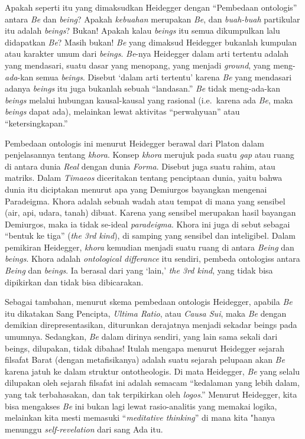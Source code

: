 \documentclass[11pt,twoside,a5paper,openany]{memoir}
\begin{document}
Apakah seperti itu yang dimaksudkan Heidegger dengan ``Pembedaan
ontologis'' antara \emph{Be} dan \emph{being}? Apakah \emph{kebuahan}
merupakan \emph{Be}, dan \emph{buah-buah} partikular itu adalah
\emph{beings}? Bukan! Apakah kalau \emph{beings} itu semua dikumpulkan
lalu didapatkan \emph{Be}? Masih bukan! \emph{Be} yang dimaksud
Heidegger bukanlah kumpulan atau karakter umum dari \emph{beings}.
\emph{Be}-nya Heidegger dalam arti tertentu adalah yang mendasari, suatu
dasar yang menopang, yang menjadi \emph{ground}, yang
meng-\emph{ada}-kan semua \emph{beings}. Disebut `dalam arti tertentu'
karena \emph{Be} yang mendasari adanya \emph{beings} itu juga bukanlah
sebuah ``landasan.'' \emph{Be} tidak meng-ada-kan \emph{beings} melalui
hubungan kausal-kausal yang rasional (i.e.~karena ada \emph{Be}, maka
\emph{beings} dapat ada), melainkan lewat aktivitas ``perwahyuan'' atau
``ketersingkapan.''

Pembedaan ontologis ini menurut Heidegger berawal dari Platon dalam
penjelasannya tentang \emph{khora}. Konsep \emph{khora} merujuk pada
suatu \emph{gap} atau ruang di antara dunia \emph{Real} dengan dunia
\emph{Forma}. Disebut juga suatu rahim, atau matriks. Dalam
\emph{Timaeos} diceritakan tentang penciptaan dunia, yaitu bahwa dunia
itu diciptakan menurut apa yang Demiurgos bayangkan mengenai Paradeigma.
Khora adalah sebuah wadah atau tempat di mana yang sensibel (air, api,
udara, tanah) dibuat. Karena yang sensibel merupakan hasil bayangan
Demiurgos, maka ia tidak se-ideal \emph{paradeigma}. Khora ini juga di
sebut sebagai ``bentuk ke tiga'' (\emph{the 3rd kind}), di samping yang
sensibel dan inteligibel. Dalam pemikiran Heidegger, \emph{khora}
kemudian menjadi suatu ruang di antara \emph{Being} dan \emph{beings}.
Khora adalah \emph{ontological differance} itu sendiri, pembeda
ontologiss antara \emph{Being} dan \emph{beings}. Ia berasal dari yang
`lain,' \emph{the 3rd kind}, yang tidak bisa dipikirkan dan tidak bisa
dibicarakan.

Sebagai tambahan, menurut skema pembedaan ontologis Heidegger, apabila
\emph{Be} itu dikatakan Sang Pencipta, \emph{Ultima Ratio}, atau
\emph{Causa Sui}, maka \emph{Be} dengan demikian direpresentasikan,
diturunkan derajatnya menjadi sekadar beings pada umumnya. Sedangkan,
\emph{Be} dalam dirinya sendiri, yang lain sama sekali dari beings,
dilupakan, tidak dibahas! Itulah mengapa menurut Heidegger sejarah
filsafat Barat (dengan metafisikanya) adalah suatu sejarah pelupaan akan
\emph{Be} karena jatuh ke dalam struktur ontotheologis. Di mata
Heidegger, \emph{Be} yang selalu dilupakan oleh sejarah filsafat ini
adalah semacam ``kedalaman yang lebih dalam, yang tak terbahasakan, dan
tak terpikirkan oleh \emph{logos}.'' Menurut Heidegger, kita bisa
mengakses \emph{Be} ini bukan lagi lewat rasio-analitis yang memakai
logika, melainkan kita mesti memasuki ``\emph{meditative thinking}'' di
mana kita "hanya menunggu \emph{self-revelation} dari sang Ada itu.
\end{document}
